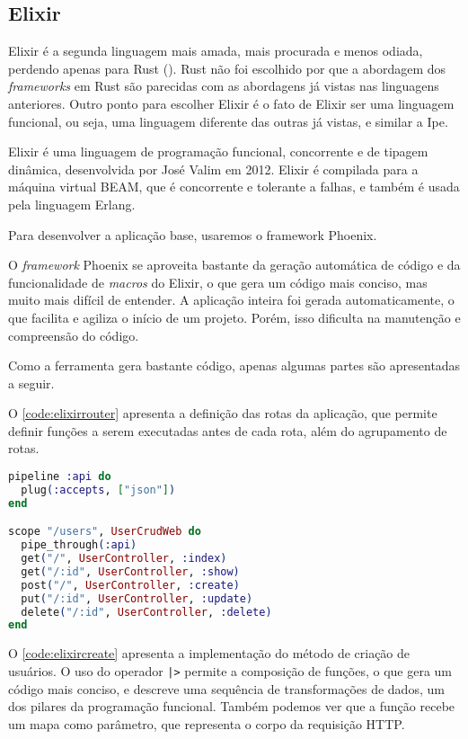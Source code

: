 \subsection{Elixir}

Elixir é a segunda linguagem mais amada, mais procurada e menos odiada, perdendo
apenas para Rust (\textcite{stackoverflowsurvey}). Rust não foi escolhido por que
a abordagem dos \textit{frameworks} em Rust são parecidas com as abordagens já
vistas nas linguagens anteriores. Outro ponto para escolher Elixir é o fato de
Elixir ser uma linguagem funcional, ou seja, uma linguagem diferente das outras
já vistas, e similar a Ipe.

Elixir é uma linguagem de programação funcional, concorrente e de tipagem dinâmica,
desenvolvida por José Valim em 2012. Elixir é compilada para a máquina virtual
BEAM, que é concorrente e tolerante a falhas, e também é usada pela linguagem
Erlang.

Para desenvolver a aplicação base, usaremos o framework Phoenix.

O \textit{framework} Phoenix se aproveita bastante da geração automática de código
e da funcionalidade de \textit{macros} do Elixir, o que gera um código mais conciso,
mas muito mais difícil de entender. A aplicação inteira foi gerada automaticamente,
o que facilita e agiliza o início de um projeto. Porém, isso dificulta na manutenção
e compreensão do código.

Como a ferramenta gera bastante código, apenas algumas partes são apresentadas a
seguir.

O \autoref{code:elixirrouter} apresenta a definição das rotas da aplicação, que
permite definir funções a serem executadas antes de cada rota, além do agrupamento
de rotas.


\begin{lstlisting}[language=Elixir,label={code:elixirrouter},caption={Definição das rotas da aplicação em Elixir com Phoenix}]
pipeline :api do
  plug(:accepts, ["json"])
end

scope "/users", UserCrudWeb do
  pipe_through(:api)
  get("/", UserController, :index)
  get("/:id", UserController, :show)
  post("/", UserController, :create)
  put("/:id", UserController, :update)
  delete("/:id", UserController, :delete)
end
\end{lstlisting}

O \autoref{code:elixircreate} apresenta a implementação do método de criação de
usuários. O uso do operador \texttt{|>} permite a composição de funções, o que
gera um código mais conciso, e descreve uma sequência de transformações de dados,
um dos pilares da programação funcional. Também podemos ver que a função recebe
um mapa como parâmetro, que representa o corpo da requisição HTTP.

